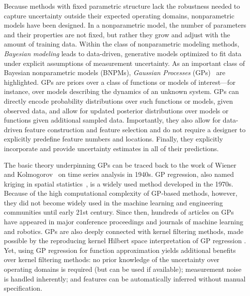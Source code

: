 \documentclass[letterpaper,12pt,peerreviewca,draftcls]{IEEEtran}
\newcommand{\XX}[1]{{\bf \color{orange}{ XX #1 XX}}}
\newcommand{\mX}[1]{\added[id=ml,remark={}]{#1}}
\begin{document}
Because methods with fixed parametric structure lack the robustness needed to capture uncertainty outside their expected operating domains,  
nonparametric models have been designed. 
In a nonparametric model, the number of parameters and their properties are not fixed, but rather they grow and adjust with the amount of training data. Within the class of nonparametric modeling methods, \emph{Bayesian modeling} leads to data-driven, generative models optimized to fit data under explicit assumptions of measurement uncertainty. As an important class of Bayesian nonparametric models (BNPMs), \emph{Gaussian Processes} (GPs)~\cite{Rasmussen:2005} are highlighted. GPs are priors over a class of functions or models of interest---for instance, over models describing the dynamics of an unknown system. GPs can directly encode probability distributions over such functions or models, given observed data, and allow for updated posterior distributions over models or functions given additional sampled data. Importantly, they also allow for data-driven feature construction and feature selection and do not require a designer to explicitly predefine feature numbers and locations. Finally, they explicitly incorporate and provide uncertainty estimates in all of their predictions. 

The basic theory underpinning GPs can be traced back to the work of Wiener~\cite{wiener1949extrapolation} and Kolmogorov~\cite{kolmogoroff1941interpolation} on time series analysis in 1940s. GP regression, also named kriging in spatial statistics~\cite{matheron1973intrinsic}\cite{journel1978mining}, is a widely used method developed in the 1970s. Because of the high computational complexity of GP-based methods, however, they did not become widely used in the machine learning and engineering communities until early 21st century. Since then, hundreds of articles on GPs have appeared in major conference proceedings and journals of machine learning and robotics. %
GPs are also deeply connected with kernel filtering methods, made possible by the reproducing kernel Hilbert space interpretation of GP regression \cite{aronszajn:TAMS:50}. Yet, using GP regression for function approximation yields additional benefits over kernel filtering methods: no prior knowledge of the uncertainty over operating domains is required (but can be used if available); measurement noise is handled inherently; and features can be automatically inferred without manual specification. %
\end{document}
